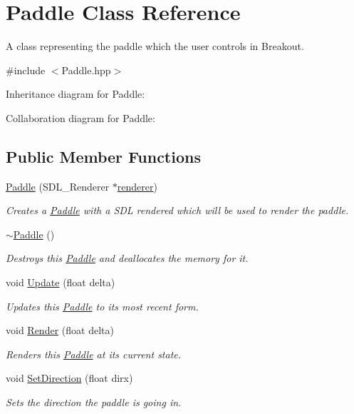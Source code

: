 \hypertarget{classPaddle}{}\section{Paddle Class Reference}
\label{classPaddle}


A class representing the paddle which the user controls in Breakout.  




{\ttfamily \#include $<$Paddle.\+hpp$>$}



Inheritance diagram for Paddle\+:


Collaboration diagram for Paddle\+:
\subsection*{Public Member Functions}
\begin{DoxyCompactItemize}
\item 
\mbox{\label{classPaddle_a44ee1ad381e793703eb2c14f152c3d8c}} 
\hyperlink{classPaddle_a44ee1ad381e793703eb2c14f152c3d8c}{Paddle} (S\+D\+L\+\_\+\+Renderer $\ast$\hyperlink{classEntity_a2747dfdd9fa4fe743c8b80450bc99dbd}{renderer})
\begin{DoxyCompactList}\small\item\em Creates a \hyperlink{classPaddle}{Paddle} with a S\+DL rendered which will be used to render the paddle. \end{DoxyCompactList}\item 
\mbox{\label{classPaddle_ac03c6b92f0b9cd2e67edff4c318ad030}} 
\hyperlink{classPaddle_ac03c6b92f0b9cd2e67edff4c318ad030}{$\sim$\+Paddle} ()
\begin{DoxyCompactList}\small\item\em Destroys this \hyperlink{classPaddle}{Paddle} and deallocates the memory for it. \end{DoxyCompactList}\item 
void \hyperlink{classPaddle_a8a3aa86f567315423f92ecfb5fd3b6f5}{Update} (float delta)
\begin{DoxyCompactList}\small\item\em Updates this \hyperlink{classPaddle}{Paddle} to its most recent form. \end{DoxyCompactList}\item 
void \hyperlink{classPaddle_a166255dfac354af75059ed4a72e1a0ee}{Render} (float delta)
\begin{DoxyCompactList}\small\item\em Renders this \hyperlink{classPaddle}{Paddle} at its current state. \end{DoxyCompactList}\item 
void \hyperlink{classPaddle_ac168c216a591b78851142d2160cebf9b}{Set\+Direction} (float dirx)
\begin{DoxyCompactList}\small\item\em Sets the direction the paddle is going in. \end{DoxyCompactList}\end{DoxyCompactItemize}
